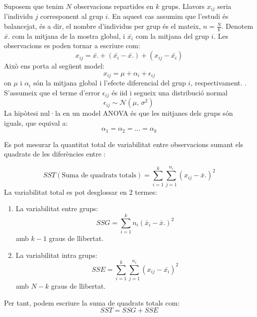 \documentclass[english]{article}
\begin{document}
Suposem que tenim $N$ observacions repartides en $k$ grups. Llavors $x_{ij}$ seria l'individu $j$ corresponent al grup $i$. En aquest cas assumim que l'estudi és balancejat, és a dir, el nombre d'individus per grup és el mateix, $n=\frac{N}{k}$. Denotem $\bar{x.}$ com la mitjana de la mostra global, i $\bar{x_{i}}$ com la mitjana del grup $i$.
Les observacions es poden tornar a escriure com:
\begin{equation*}
x_{ij} = \bar{x.} + (\bar{x_{i}} - \bar{x.}) + (x_{ij} - \bar{x_{i}})
\end{equation*}
Això ens porta al següent model:
\begin{equation*}
x_{ij} = \mu + \alpha_{i} + \epsilon_{ij}
\end{equation*}
on $\mu$ i $\alpha_{i}$ són la mitjana global i l'efecte diferencial del grup $i$, respectivament. . S'assumeix que el terme d'error $\epsilon_{ij}$ és iid i segueix una distribució normal
\begin{equation*}
\epsilon_{ij} \sim \mathcal{N}(\mu,\,\sigma^{2})\,
\end{equation*}
La hipòtesi nul·la en un model ANOVA és que les mitjanes dels grups són iguals, que equival a:
\begin{equation*}
\alpha_1 = \alpha_2 = ... = \alpha_k
\end{equation*}

Es pot mesurar la quantitat total de variabilitat entre observacions sumant els quadrats de les diferències entre :

\begin{equation*}
SST(\text{Suma de quadrats totals}) = \sum_{i=1}^{k} \sum_{j=1}^{n_{i}} (x_{ij} - \bar{x}.)^2
\end{equation*}
La variabilitat total es pot desglossar en 2 termes:
\begin{enumerate}
\item La variabilitat entre grups:
\begin{equation*}
SSG = \sum_{i=1}^{k} n_{i}(\bar{x}_{i} - \bar{x}.)^2
\end{equation*}
amb $k-1$ graus de llibertat.
\item La variabilitat intra grups:
\begin{equation*}
SSE = \sum_{i=1}^{k} \sum_{j=1}^{n_{i}} (x_{ij} - \bar{x_{i}})^2
\end{equation*}
amb $N-k$ graus de llibertat.
\end{enumerate}
Per tant, podem escriure la suma de quadrats totals com:
\begin{equation*}
SST = SSG + SSE
\end{equation*}
\end{document}
